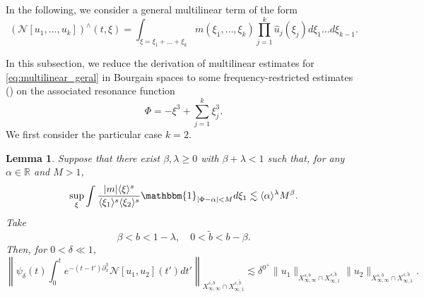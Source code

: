 \documentclass[%
11pt,  reqno]{amsart}
\newcommand{\jap}[1]{\langle #1 \rangle}
\newcommand{\5}{\textup{V}}
\newcommand{\les}{\lesssim}
\newtheorem{lemma}[theorem]{Lemma}
\theoremstyle{remark}
\newcommand{\R}{\mathbb{R}}
\numberwithin{equation}{section}
\numberwithin{theorem}{section}
\begin{document}
	{
		
		In the following, we consider a general multilinear term of the form
		\begin{equation}\label{eq:multilinear_geral}
			(\mathcal{N}[u_1,\dots, u_k])^\wedge(t,\xi)=\int_{\xi=\xi_1+\dots+\xi_k} m(\xi_1,\dots,\xi_k)\prod_{j=1}^k\hat{u}_j(\xi_j) d\xi_1\dots d\xi_{k-1}.
		\end{equation}
        
		In this subsection, we reduce the derivation of multilinear estimates for \eqref{eq:multilinear_geral} in Bourgain spaces to some frequency-restricted estimates (\cite{COS}) on the associated resonance function
        $$
        \Phi=-\xi^3+\sum_{j=1}^k\xi_j^3.
        $$
		We first consider the particular case $k=2$. 
		
		\begin{lemma}\label{lem:reduction_fre_k2}
			Suppose that there exist $\beta,\lambda\ge 0$ with $\beta+\lambda<1$ such that, for any $\alpha\in \R$ and $M>1$,
			\begin{equation}\label{fre}
				\sup_{\xi} \int \frac{|m|\jap{\xi}^s}{\jap{\xi_1}^s\jap{\xi_2}^s} \mathbbm{1}_{|\Phi-\alpha|<M} d\xi_1 \lesssim \jap{\alpha}^\lambda M^\beta.
			\end{equation}
            Take
            $$
            \beta<b<1-\lambda,\quad 0<\tilde{b}<b-\beta.
            $$
Then, for $0<\delta\ll 1$,
\begin{equation}\label{eq:bilin_infty}
    \left\|\psi_\delta(t)\int_0^t e^{-(t-t')\partial_x^3}\mathcal{N}[u_1,u_2](t')dt' \right\|_{X^{s,b}_{\infty, \infty} \cap X^{s,\tilde{b}}_{\infty,1}}  \les \delta^{0^+}\|u_1\|_{X^{s,b}_{\infty, \infty} \cap X^{s,\tilde{b}}_{\infty,1}}\|u_2\|_{X^{s,b}_{\infty, \infty} \cap X^{s,\tilde{b}}_{\infty,1}}.
\end{equation}
            

\end{lemma}}
\end{document}
